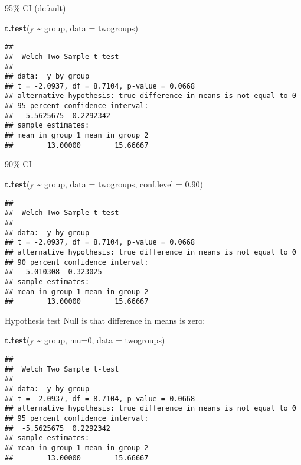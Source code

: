 \documentclass[
  ignorenonframetext,
]{beamer}
\newenvironment{Shaded}{\begin{snugshade}}{\end{snugshade}}
\newcommand{\DataTypeTok}[1]{\textcolor[rgb]{0.13,0.29,0.53}{#1}}
\newcommand{\DecValTok}[1]{\textcolor[rgb]{0.00,0.00,0.81}{#1}}
\newcommand{\FloatTok}[1]{\textcolor[rgb]{0.00,0.00,0.81}{#1}}
\newcommand{\KeywordTok}[1]{\textcolor[rgb]{0.13,0.29,0.53}{\textbf{#1}}}
\newcommand{\NormalTok}[1]{#1}
\newcommand{\OperatorTok}[1]{\textcolor[rgb]{0.81,0.36,0.00}{\textbf{#1}}}
\newcommand{\StringTok}[1]{\textcolor[rgb]{0.31,0.60,0.02}{#1}}
\begin{document}
\begin{frame}[fragile]{95\% CI (default)}
\protect\hypertarget{ci-default}{}
\begin{Shaded}
\begin{Highlighting}[]
\KeywordTok{t.test}\NormalTok{(y }\OperatorTok{\textasciitilde{}}\StringTok{ }\NormalTok{group, }\DataTypeTok{data =}\NormalTok{ twogroups)}
\end{Highlighting}
\end{Shaded}

\begin{verbatim}
## 
##  Welch Two Sample t-test
## 
## data:  y by group
## t = -2.0937, df = 8.7104, p-value = 0.0668
## alternative hypothesis: true difference in means is not equal to 0
## 95 percent confidence interval:
##  -5.5625675  0.2292342
## sample estimates:
## mean in group 1 mean in group 2 
##        13.00000        15.66667
\end{verbatim}
\end{frame}

\begin{frame}[fragile]{90\% CI}
\protect\hypertarget{ci}{}
\begin{Shaded}
\begin{Highlighting}[]
\KeywordTok{t.test}\NormalTok{(y }\OperatorTok{\textasciitilde{}}\StringTok{ }\NormalTok{group, }\DataTypeTok{data =}\NormalTok{ twogroups, }\DataTypeTok{conf.level =} \FloatTok{0.90}\NormalTok{)}
\end{Highlighting}
\end{Shaded}

\begin{verbatim}
## 
##  Welch Two Sample t-test
## 
## data:  y by group
## t = -2.0937, df = 8.7104, p-value = 0.0668
## alternative hypothesis: true difference in means is not equal to 0
## 90 percent confidence interval:
##  -5.010308 -0.323025
## sample estimates:
## mean in group 1 mean in group 2 
##        13.00000        15.66667
\end{verbatim}
\end{frame}

\begin{frame}[fragile]{Hypothesis test}
\protect\hypertarget{hypothesis-test}{}
Null is that difference in means is zero:

\begin{Shaded}
\begin{Highlighting}[]
\KeywordTok{t.test}\NormalTok{(y }\OperatorTok{\textasciitilde{}}\StringTok{ }\NormalTok{group, }\DataTypeTok{mu=}\DecValTok{0}\NormalTok{, }\DataTypeTok{data =}\NormalTok{ twogroups)}
\end{Highlighting}
\end{Shaded}

\begin{verbatim}
## 
##  Welch Two Sample t-test
## 
## data:  y by group
## t = -2.0937, df = 8.7104, p-value = 0.0668
## alternative hypothesis: true difference in means is not equal to 0
## 95 percent confidence interval:
##  -5.5625675  0.2292342
## sample estimates:
## mean in group 1 mean in group 2 
##        13.00000        15.66667
\end{verbatim}
\end{frame}
\end{document}

